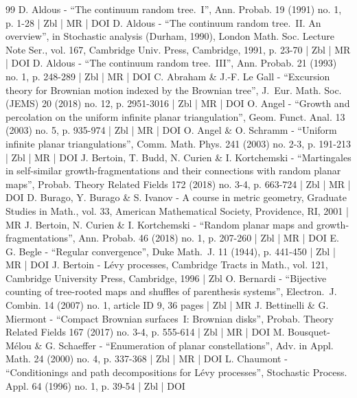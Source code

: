 \documentclass[10pt]{amsart}
\theoremstyle{plain}
\numberwithin{theorem}{section}
\theoremstyle{definition}
\begin{document}
\begin{thebibliography}{99}
D. Aldous - “The continuum random tree. I”, Ann. Probab. 19 (1991) no. 1, p. 1-28 | Zbl | MR | DOI
D. Aldous - “The continuum random tree. II. An overview”, in Stochastic analysis (Durham, 1990), London Math. Soc. Lecture Note Ser., vol. 167, Cambridge Univ. Press, Cambridge, 1991, p. 23-70 | Zbl | MR | DOI
D. Aldous - “The continuum random tree. III”, Ann. Probab. 21 (1993) no. 1, p. 248-289 | Zbl | MR | DOI
C. Abraham \& J.-F. Le Gall - “Excursion theory for Brownian motion indexed by the Brownian tree”, J. Eur. Math. Soc. (JEMS) 20 (2018) no. 12, p. 2951-3016 | Zbl | MR | DOI
O. Angel - “Growth and percolation on the uniform infinite planar triangulation”, Geom. Funct. Anal. 13 (2003) no. 5, p. 935-974 | Zbl | MR | DOI
O. Angel \& O. Schramm - “Uniform infinite planar triangulations”, Comm. Math. Phys. 241 (2003) no. 2-3, p. 191-213 | Zbl | MR | DOI
J. Bertoin, T. Budd, N. Curien \& I. Kortchemski - “Martingales in self-similar growth-fragmentations and their connections with random planar maps”, Probab. Theory Related Fields 172 (2018) no. 3-4, p. 663-724 | Zbl | MR | DOI
D. Burago, Y. Burago \& S. Ivanov - A course in metric geometry, Graduate Studies in Math., vol. 33, American Mathematical Society, Providence, RI, 2001 | MR
J. Bertoin, N. Curien \& I. Kortchemski - “Random planar maps and growth-fragmentations”, Ann. Probab. 46 (2018) no. 1, p. 207-260 | Zbl | MR | DOI
E. G. Begle - “Regular convergence”, Duke Math. J. 11 (1944), p. 441-450 | Zbl | MR | DOI
J. Bertoin - Lévy processes, Cambridge Tracts in Math., vol. 121, Cambridge University Press, Cambridge, 1996 | Zbl
O. Bernardi - “Bijective counting of tree-rooted maps and shuffles of parenthesis systems”, Electron. J. Combin. 14 (2007) no. 1, article ID 9, 36 pages | Zbl | MR
J. Bettinelli \& G. Miermont - “Compact Brownian surfaces I: Brownian disks”, Probab. Theory Related Fields 167 (2017) no. 3-4, p. 555-614 | Zbl | MR | DOI
M. Bousquet-Mélou \& G. Schaeffer - “Enumeration of planar constellations”, Adv. in Appl. Math. 24 (2000) no. 4, p. 337-368 | Zbl | MR | DOI
L. Chaumont - “Conditionings and path decompositions for Lévy processes”, Stochastic Process. Appl. 64 (1996) no. 1, p. 39-54 | Zbl | DOI

\end{thebibliography}
\end{document}
